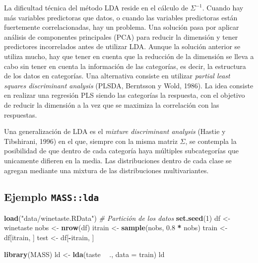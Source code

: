 \documentclass[
]{book}
\newenvironment{Shaded}{\begin{snugshade}}{\end{snugshade}}
\newcommand{\CommentTok}[1]{\textcolor[rgb]{0.56,0.35,0.01}{\textit{#1}}}
\newcommand{\DataTypeTok}[1]{\textcolor[rgb]{0.13,0.29,0.53}{#1}}
\newcommand{\DecValTok}[1]{\textcolor[rgb]{0.00,0.00,0.81}{#1}}
\newcommand{\FloatTok}[1]{\textcolor[rgb]{0.00,0.00,0.81}{#1}}
\newcommand{\KeywordTok}[1]{\textcolor[rgb]{0.13,0.29,0.53}{\textbf{#1}}}
\newcommand{\NormalTok}[1]{#1}
\newcommand{\OperatorTok}[1]{\textcolor[rgb]{0.81,0.36,0.00}{\textbf{#1}}}
\newcommand{\StringTok}[1]{\textcolor[rgb]{0.31,0.60,0.02}{#1}}
\theoremstyle{break}
\theoremstyle{definition}
\theoremstyle{definition}
\theoremstyle{definition}
\theoremstyle{remark}
\begin{document}
La dificultad técnica del método LDA reside en el cálculo de \(\Sigma^{-1}\). Cuando hay más variables predictoras que datos, o cuando las variables predictoras están fuertemente correlacionadas, hay un problema. Una solución pasa por aplicar análisis de componentes principales (PCA) para reducir la dimensión y tener predictores incorrelados antes de utilizar LDA. Aunque la solución anterior se utiliza mucho, hay que tener en cuenta que la reducción de la dimensión se lleva a cabo sin tener en cuenta la información de las categorías, es decir, la estructura de los datos en categorías. Una alternativa consiste en utilizar \emph{partial least squares discriminant analysis} (PLSDA, Berntsson y Wold, 1986). La idea consiste en realizar una regresión PLS siendo las categorías la respuesta, con el objetivo de reducir la dimensión a la vez que se maximiza la correlación con las respuestas.

Una generalización de LDA es el \emph{mixture discriminant analysis} (Hastie y Tibshirani, 1996) en el que, siempre con la misma matriz \(\Sigma\), se contempla la posibilidad de que dentro de cada categoría haya múltiples subcategorías que unicamente difieren en la media. Las distribuciones dentro de cada clase se agregan mediante una mixtura de las distribuciones multivariantes.

\hypertarget{ejemplo-masslda}{%
\subsection{\texorpdfstring{Ejemplo \texttt{MASS::lda}}{Ejemplo MASS::lda}}\label{ejemplo-masslda}}

\begin{Shaded}
\begin{Highlighting}[]
\KeywordTok{load}\NormalTok{(}\StringTok{"data/winetaste.RData"}\NormalTok{)}
\CommentTok{# Partición de los datos}
\KeywordTok{set.seed}\NormalTok{(}\DecValTok{1}\NormalTok{)}
\NormalTok{df <-}\StringTok{ }\NormalTok{winetaste}
\NormalTok{nobs <-}\StringTok{ }\KeywordTok{nrow}\NormalTok{(df)}
\NormalTok{itrain <-}\StringTok{ }\KeywordTok{sample}\NormalTok{(nobs, }\FloatTok{0.8} \OperatorTok{*}\StringTok{ }\NormalTok{nobs)}
\NormalTok{train <-}\StringTok{ }\NormalTok{df[itrain, ]}
\NormalTok{test <-}\StringTok{ }\NormalTok{df[}\OperatorTok{-}\NormalTok{itrain, ]}

\KeywordTok{library}\NormalTok{(MASS)}
\NormalTok{ld <-}\StringTok{ }\KeywordTok{lda}\NormalTok{(taste }\OperatorTok{~}\StringTok{ }\NormalTok{., }\DataTypeTok{data =}\NormalTok{ train)}
\NormalTok{ld}
\end{Highlighting}
\end{Shaded}
\end{document}
